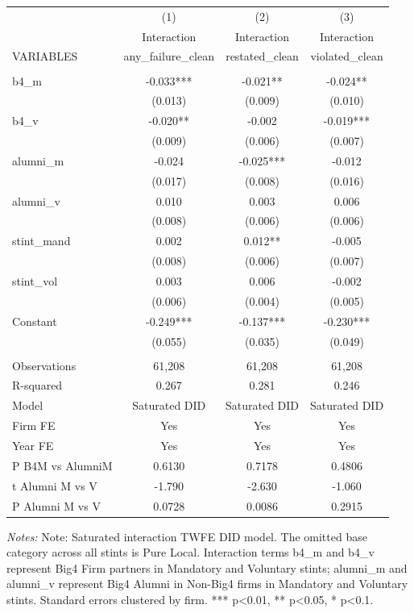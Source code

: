 \documentclass[10pt]{article}
\begin{document}
\begin{minipage}{19cm}\fontsize{10}{12}\selectfont\setlength{\tabcolsep}{4pt}\renewcommand{\arraystretch}{1.12}


\centering
{}
\begin{threeparttable}
\begin{tabular}{p{}ccc}
\toprule
 & (1) & (2) & (3) \\
 & Interaction & Interaction & Interaction \\
VARIABLES & any\_failure\_clean & restated\_clean & violated\_clean \\
\midrule
 &  &  &  \\
b4\_m & -0.033*** & -0.021** & -0.024** \\
 & (0.013) & (0.009) & (0.010) \\
b4\_v & -0.020** & -0.002 & -0.019*** \\
 & (0.009) & (0.006) & (0.007) \\
alumni\_m & -0.024 & -0.025*** & -0.012 \\
 & (0.017) & (0.008) & (0.016) \\
alumni\_v & 0.010 & 0.003 & 0.006 \\
 & (0.008) & (0.006) & (0.006) \\
stint\_mand & 0.002 & 0.012** & -0.005 \\
 & (0.008) & (0.006) & (0.007) \\
stint\_vol & 0.003 & 0.006 & -0.002 \\
 & (0.006) & (0.004) & (0.005) \\
Constant & -0.249*** & -0.137*** & -0.230*** \\
 & (0.055) & (0.035) & (0.049) \\
 &  &  &  \\
Observations & 61,208 & 61,208 & 61,208 \\
R-squared & 0.267 & 0.281 & 0.246 \\
Model & Saturated DID & Saturated DID & Saturated DID \\
Firm FE & Yes & Yes & Yes \\
Year FE & Yes & Yes & Yes \\
P B4M vs AlumniM & 0.6130 & 0.7178 & 0.4806 \\
t Alumni M vs V & -1.790 & -2.630 & -1.060 \\
P Alumni M vs V & 0.0728 & 0.0086 & 0.2915 \\
\bottomrule
\end{tabular}
\begin{tablenotes}\fontsize{9}{11}\selectfont
\item \raggedright \fontsize{9}{11}\selectfont \textit{Notes:} Note: Saturated interaction TWFE DID model. The omitted base category across all stints is Pure Local. Interaction terms b4\_m and b4\_v represent Big4 Firm partners in Mandatory and Voluntary stints; alumni\_m and alumni\_v represent Big4 Alumni in Non-Big4 firms in Mandatory and Voluntary stints. Standard errors clustered by firm. *** p<0.01, ** p<0.05, * p<0.1.
\end{tablenotes}
\end{threeparttable}

\end{minipage}
\end{document}
